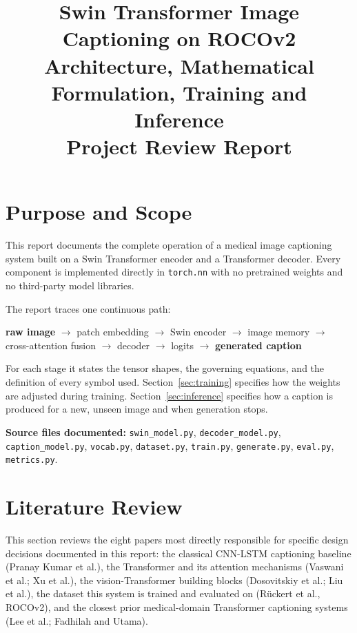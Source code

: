 \documentclass[12pt]{article}
\title{\Large Swin Transformer Image Captioning on ROCOv2 \\[4pt]
\large Architecture, Mathematical Formulation, Training and Inference \\[8pt]
\normalsize Project Review Report}
\author{}
\date{}
\newcommand{\code}[1]{\texttt{#1}}
\begin{document}
\maketitle

\tableofcontents
\newpage

\section{Purpose and Scope}

This report documents the complete operation of a medical image captioning system built on a Swin Transformer encoder and a Transformer decoder. Every component is implemented directly in \code{torch.nn} with no pretrained weights and no third-party model libraries.

The report traces one continuous path:

\begin{center}
\textbf{raw image} $\rightarrow$ patch embedding $\rightarrow$ Swin encoder $\rightarrow$ image memory $\rightarrow$ cross-attention fusion $\rightarrow$ decoder $\rightarrow$ logits $\rightarrow$ \textbf{generated caption}
\end{center}

For each stage it states the tensor shapes, the governing equations, and the definition of every symbol used. Section~\ref{sec:training} specifies how the weights are adjusted during training. Section~\ref{sec:inference} specifies how a caption is produced for a new, unseen image and when generation stops.

\textbf{Source files documented:} \code{swin\_model.py}, \code{decoder\_model.py}, \code{caption\_model.py}, \code{vocab.py}, \code{dataset.py}, \code{train.py}, \code{generate.py}, \code{eval.py}, \code{metrics.py}.

\section*{Literature Review}

This section reviews the eight papers most directly responsible for specific design decisions documented in this report: the classical CNN-LSTM captioning baseline (Pranay Kumar et al.), the Transformer and its attention mechanisms (Vaswani et al.; Xu et al.), the vision-Transformer building blocks (Dosovitskiy et al.; Liu et al.), the dataset this system is trained and evaluated on (R\"uckert et al., ROCOv2), and the closest prior medical-domain Transformer captioning systems (Lee et al.; Fadhilah and Utama).
\end{document}
